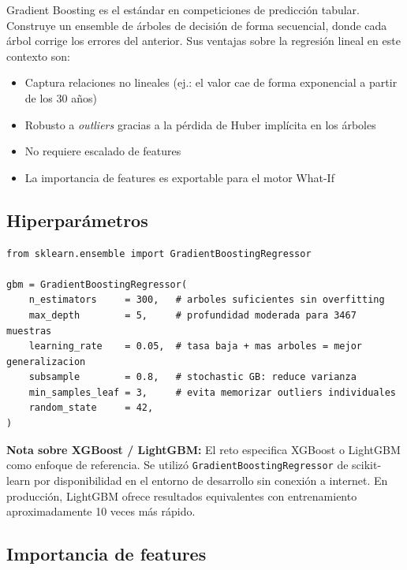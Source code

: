 \documentclass[12pt,a4paper]{report}
\begin{document}
Gradient Boosting es el estándar en competiciones de predicción tabular. Construye un ensemble de árboles de decisión de forma secuencial, donde cada árbol corrige los errores del anterior. Sus ventajas sobre la regresión lineal en este contexto son:

\begin{itemize}
  \item Captura relaciones no lineales (ej.: el valor cae de forma exponencial a partir de los 30 años)
  \item Robusto a \textit{outliers} gracias a la pérdida de Huber implícita en los árboles
  \item No requiere escalado de features
  \item La importancia de features es exportable para el motor What-If
\end{itemize}

\subsection{Hiperparámetros}

\begin{lstlisting}[caption={Configuración del GradientBoostingRegressor}]
from sklearn.ensemble import GradientBoostingRegressor

gbm = GradientBoostingRegressor(
    n_estimators     = 300,   # arboles suficientes sin overfitting
    max_depth        = 5,     # profundidad moderada para 3467 muestras
    learning_rate    = 0.05,  # tasa baja + mas arboles = mejor generalizacion
    subsample        = 0.8,   # stochastic GB: reduce varianza
    min_samples_leaf = 3,     # evita memorizar outliers individuales
    random_state     = 42,
)
\end{lstlisting}

\begin{infobox}
\textbf{Nota sobre XGBoost / LightGBM:} El reto especifica XGBoost o LightGBM como enfoque de referencia. Se utilizó \texttt{GradientBoostingRegressor} de scikit-learn por disponibilidad en el entorno de desarrollo sin conexión a internet. En producción, LightGBM ofrece resultados equivalentes con entrenamiento aproximadamente 10 veces más rápido.
\end{infobox}

\subsection{Importancia de features}
\end{document}
